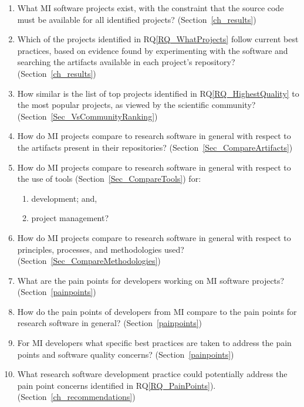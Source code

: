 \documentclass[final, 3p, times, authoryear]{elsarticle}
\newcounter{rqnum} %
\newcommand{\rqref}[1]{RQ\ref{#1}}
\newcounter{qnum} %
\begin{document}
\begin{enumerate}
	\item[RQ\refstepcounter{rqnum}\therqnum \label{RQ_WhatProjects}:] What MI
	software projects exist, with the constraint that the source code must be
	available for all identified projects? (Section~\ref{ch_results})
	\item [RQ\refstepcounter{rqnum}\therqnum \label{RQ_HighestQuality}:] Which
	of the projects identified in \rqref{RQ_WhatProjects} follow current best
	practices, based on evidence found by experimenting with the software and
	searching the artifacts available in each project's repository?
	(Section~\ref{ch_results})
	\item [RQ\refstepcounter{rqnum}\therqnum \label{RQ_CompareHQ2Popular}:] How
	similar is the list of top projects identified in \rqref{RQ_HighestQuality}
	to the most popular projects, as viewed by the scientific community?
	(Section~\ref{Sec_VsCommunityRanking})
    \item [RQ\refstepcounter{rqnum}\therqnum \label{RQ_CompareArtifacts}:] How
	do MI projects compare to research software in general with respect to the
	artifacts present in their repositories?
	(Section~\ref{Sec_CompareArtifacts})
	\item [RQ\refstepcounter{rqnum}\therqnum \label{RQ_CompareToolsProjMngmnt}:]
	How do MI projects compare to research software in general with respect to
	the use of tools (Section~\ref{Sec_CompareTools}) for:
	\begin{enumerate} 
		\item [\rqref{RQ_CompareToolsProjMngmnt}.a] development; and,
		\item [\rqref{RQ_CompareToolsProjMngmnt}.b] project management?
	\end{enumerate}
	\item [RQ\refstepcounter{rqnum}\therqnum \label{RQ_CompareMethodologies}:]
	How do MI projects compare to research software in general with respect to
	principles, processes, and methodologies used?
	(Section~\ref{Sec_CompareMethodologies})
	\item [RQ\refstepcounter{rqnum}\therqnum \label{RQ_PainPoints}:] What are
	the pain points for developers working on MI software projects?
	(Section~\ref{painpoints})
	\item [RQ\refstepcounter{rqnum}\therqnum \label{RQ_ComparePainPoints}:] How
	do the pain points of developers from MI compare to the pain points
	for research software in general? (Section~\ref{painpoints})
	\item [RQ\refstepcounter{rqnum}\therqnum \label{RQ_Concerns}:] For MI
	developers what specific best practices are taken to address the pain points
	and software quality concerns? (Section~\ref{painpoints})
	\item [RQ\refstepcounter{rqnum}\therqnum \label{RQ_Recommend}:]
	What research software development practice could potentially address the
	pain point concerns identified in \rqref{RQ_PainPoints}).
	(Section~\ref{ch_recommendations})

\end{enumerate}
\end{document}
